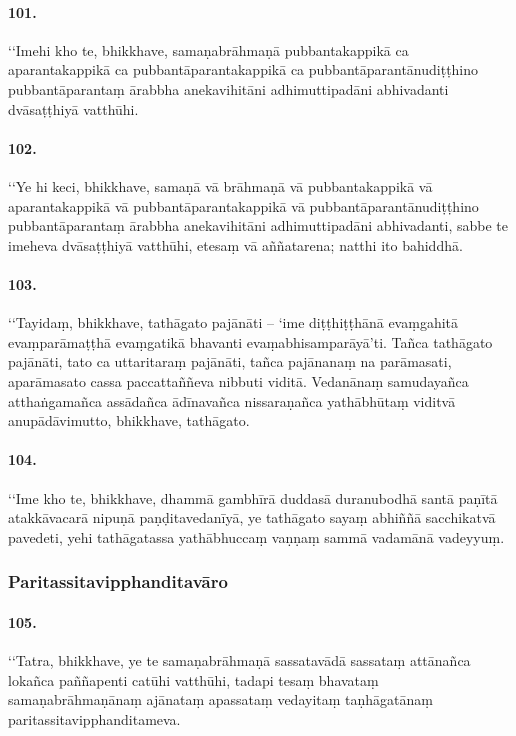 \paragraph{101.}
‘‘Imehi kho te, bhikkhave, samaṇabrāhmaṇā pubbantakappikā ca aparantakappikā ca pubbantāparantakappikā ca pubbantāparantānudiṭṭhino pubbantāparantaṃ ārabbha anekavihitāni adhimuttipadāni abhivadanti dvāsaṭṭhiyā vatthūhi.

\paragraph{102.}
‘‘Ye hi keci, bhikkhave, samaṇā vā brāhmaṇā vā pubbantakappikā vā aparantakappikā vā pubbantāparantakappikā vā pubbantāparantānudiṭṭhino pubbantāparantaṃ ārabbha anekavihitāni adhimuttipadāni abhivadanti, sabbe te imeheva dvāsaṭṭhiyā vatthūhi, etesaṃ vā aññatarena; natthi ito bahiddhā.

\paragraph{103.}
‘‘Tayidaṃ, bhikkhave, tathāgato pajānāti – ‘ime diṭṭhiṭṭhānā evaṃgahitā evaṃparāmaṭṭhā evaṃgatikā bhavanti evaṃabhisamparāyā’ti. Tañca tathāgato pajānāti, tato ca uttaritaraṃ pajānāti, tañca pajānanaṃ na parāmasati, aparāmasato cassa paccattaññeva nibbuti viditā. Vedanānaṃ samudayañca atthaṅgamañca assādañca ādīnavañca nissaraṇañca yathābhūtaṃ viditvā anupādāvimutto, bhikkhave, tathāgato.

\paragraph{104.}
‘‘Ime kho te, bhikkhave, dhammā gambhīrā duddasā duranubodhā santā paṇītā atakkāvacarā nipuṇā paṇḍitavedanīyā, ye tathāgato sayaṃ abhiññā sacchikatvā pavedeti, yehi tathāgatassa yathābhuccaṃ vaṇṇaṃ sammā vadamānā vadeyyuṃ.

\subsubsection{Paritassitavipphanditavāro}

\paragraph{105.}
‘‘Tatra, bhikkhave, ye te samaṇabrāhmaṇā sassatavādā sassataṃ attānañca lokañca paññapenti catūhi vatthūhi, tadapi tesaṃ bhavataṃ samaṇabrāhmaṇānaṃ ajānataṃ apassataṃ vedayitaṃ taṇhāgatānaṃ paritassitavipphanditameva.

